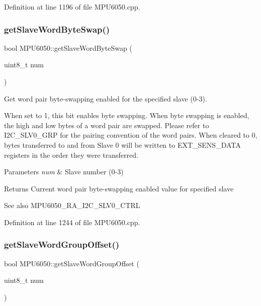 Definition at line 1196 of file M\+P\+U6050.\+cpp.

\mbox{\label{classMPU6050_a18e8f3d053a68f0e5ecf497c87ecac8a}} 
\subsubsection{\texorpdfstring{getSlaveWordByteSwap()}{getSlaveWordByteSwap()}}
{\footnotesize\ttfamily bool M\+P\+U6050\+::get\+Slave\+Word\+Byte\+Swap (\begin{DoxyParamCaption}\item[{uint8\+\_\+t}]{num }\end{DoxyParamCaption})}



Get word pair byte-\/swapping enabled for the specified slave (0-\/3). 

When set to 1, this bit enables byte swapping. When byte swapping is enabled, the high and low bytes of a word pair are swapped. Please refer to I2\+C\+\_\+\+S\+L\+V0\+\_\+\+G\+RP for the pairing convention of the word pairs. When cleared to 0, bytes transferred to and from Slave 0 will be written to E\+X\+T\+\_\+\+S\+E\+N\+S\+\_\+\+D\+A\+TA registers in the order they were transferred.


\begin{DoxyParams}{Parameters}
{\em num} & Slave number (0-\/3) \\
\hline
\end{DoxyParams}
\begin{DoxyReturn}{Returns}
Current word pair byte-\/swapping enabled value for specified slave 
\end{DoxyReturn}
\begin{DoxySeeAlso}{See also}
M\+P\+U6050\+\_\+\+R\+A\+\_\+\+I2\+C\+\_\+\+S\+L\+V0\+\_\+\+C\+T\+RL 
\end{DoxySeeAlso}


Definition at line 1244 of file M\+P\+U6050.\+cpp.

\mbox{\label{classMPU6050_a32ce8023bb80afc5d55811de70c7214f}} 
\subsubsection{\texorpdfstring{getSlaveWordGroupOffset()}{getSlaveWordGroupOffset()}}
{\footnotesize\ttfamily bool M\+P\+U6050\+::get\+Slave\+Word\+Group\+Offset (\begin{DoxyParamCaption}\item[{uint8\+\_\+t}]{num }\end{DoxyParamCaption})}



